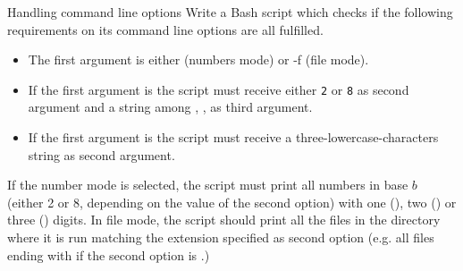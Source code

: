 
\begin{exercise}[DodgerBlue]{Handling command line options}
    Write a Bash script which checks if the following requirements on its command line options are all fulfilled.
    \begin{itemize}
        \item The first argument is  either  (numbers mode) or {-f} (file mode).
        \item If the first argument is  the script must receive either \texttt{2} or \texttt{8} as second argument and a string among , ,  as third argument.
        \item If the first argument is  the script must receive a three-lowercase-characters string as second argument.
    \end{itemize}
    If the number mode is selected, the script must print all numbers in base $b$ (either 2 or 8, depending on the value of the second option) with one (), two () or three () digits.
    In file mode, the script should print all the files in the directory where it is run matching the extension specified as second option (e.g. all files ending with  if the second option is .)
\end{exercise}